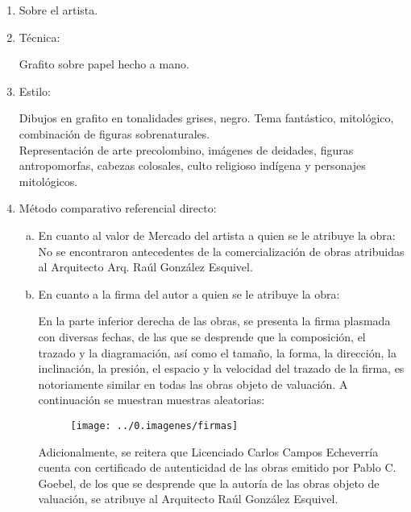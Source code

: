 \begin{enumerate}[1.]

\item Sobre el artista.\\
\insertar

\item T\'ecnica:

Grafito sobre papel hecho a mano.

\item Estilo:

Dibujos en grafito en tonalidades grises, negro. Tema fant\'astico, mitol\'ogico, combinaci\'on de figuras sobrenaturales. \\

Representaci\'on de arte precolombino, im\'agenes de deidades, figuras antropomorfas, cabezas colosales, culto religioso indígena y personajes mitol\'ogicos.\\

\item M\'etodo comparativo referencial directo:
\begin{enumerate}[a.]

\item En cuanto al valor de Mercado del artista a quien se le atribuye la obra:\\

No se encontraron antecedentes de la comercializaci\'on de obras atribuidas al Arquitecto Arq. Ra\'ul Gonz\'alez Esquivel.

\item En cuanto a la firma del autor a quien se le atribuye la obra:

En la parte inferior derecha de las obras, se presenta la firma plasmada con diversas fechas, de las que se desprende que la composici\'on, el trazado y la diagramaci\'on, as\'i como el tama\~no, la forma, la direcci\'on, la inclinaci\'on, la presi\'on, el espacio y la velocidad del trazado de la firma, es notoriamente similar en todas las obras objeto de valuaci\'on. A continuaci\'on se muestran muestras aleatorias:

\begin{figure}
\centering
\texttt{[image: ../0.imagenes/firmas]}
\end{figure}

Adicionalmente, se reitera que Licenciado Carlos Campos Echeverr\'ia cuenta con certificado de autenticidad de las obras emitido por Pablo C. Goebel, de los que se desprende que la autor\'ia de las obras objeto de valuaci\'on, se atribuye al Arquitecto Ra\'ul Gonz\'alez Esquivel.
\end{enumerate}


\end{enumerate}
